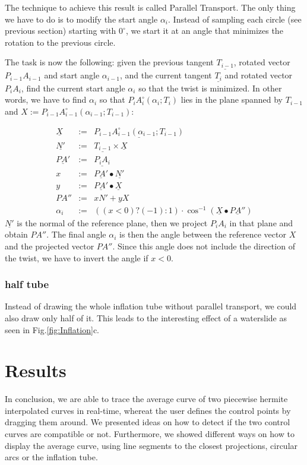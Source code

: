 \documentclass[journal, letterpaper]{IEEEtran}
\begin{document}
The technique to achieve this result is called Parallel Transport. The only thing we have to do is to modify the start angle $\alpha_i$. Instead of sampling each circle (see previous section) starting with $0^{\circ}$, we start it at an angle that minimizes the rotation to the previous circle.

The task is now the following: given the previous tangent $\underline{T_{i-1}}$, rotated vector $P_{i-1}A_{i-1}$ and start angle $\alpha_{i-1}$, and the current tangent $\underline{T_i}$ and rotated vector $P_i A_i$, find the current start angle $\alpha_i$ so that the twist is minimized.
In other words, we have to find $\alpha_i$ so that $P_i A_i^{\circ}(\alpha_i; T_i)$ lies in the plane spanned by $T_{i-1}$ and $X:=P_{i-1}A_{i-1}^{\circ}(\alpha_{i-1}; T_{i-1})$:

\begin{equation}
	\begin{array}{rcl}
		\underline{X} &:=& \underline{P_{i-1}A_{i-1}^{\circ}(\alpha_{i-1}; T_{i-1})} \\
		\underline{N'} &:=& \underline{T_{i-1}} \times \underline{X} \\
		\underline{PA'} &:=& \underline{P_i A_i} \\
		x &:=& \underline{PA'} \bullet \underline{N'} \\
		y &:=& \underline{PA'} \bullet \underline{X} \\
		PA'' &:=& xN' + yX \\
		\alpha_i &:=& ( (x<0)?(-1):1 ) \cdot \cos^{-1}(\underline{X} \bullet \underline{PA''})
	\end{array}
\label{eq:ParallelTransport}
\end{equation}
$\underline{N'}$ is the normal of the reference plane, then we project $P_i A_i$ in that plane and obtain $PA''$. The final angle $\alpha_i$ is then the angle between the reference vector $X$ and the projected vector $PA''$. Since this angle does not include the direction of the twist, we have to invert the angle if $x<0$.

\subsubsection{half tube}
Instead of drawing the whole inflation tube without parallel transport, we could also draw only half of it. This leads to the interesting effect of a waterslide as seen in Fig.\ref{fig:Inflation}c.

\section{Results}
In conclusion, we are able to trace the average curve of two piecewise hermite interpolated curves in real-time, whereat the user defines the control points by dragging them around.
We presented ideas on how to detect if the two control curves are compatible or not.
Furthermore, we showed different ways on how to display the average curve, using line segments to the closest projections, circular arcs or the inflation tube.
\end{document}
